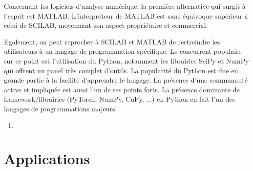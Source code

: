 \documentclass[3p, twocolumn]{elsarticle}
\begin{document}
Concernant les logiciels d'analyse numérique, la première alternative qui surgit à l'esprit est MATLAB. L'interpréteur de MATLAB est sans équivoque supérieur à celui de SCILAB, moyennant son aspect propriétaire et commercial. 

Egalement, on peut reprocher à SCILAB et MATLAB de restreindre les utilisateurs à un langage de programmation spécifique. Le concurrent populaire sur ce point est l'utilisation du Python, notamment les librairies SciPy et NumPy qui offrent un panel très complet d'outils. La popularité du Python est due en grande partie à la facilité d'apprendre le langage. La présence d'une communauté active et impliquée est aussi l'un de ses points forts. La présence dominante de framework/librairies (PyTorch, NumPy, CuPy, ...) en Python en fait l'un des langages de programmations majeurs.
\begin{enumerate}
    \item 
\end{enumerate}
\section{Applications}
\end{document}
